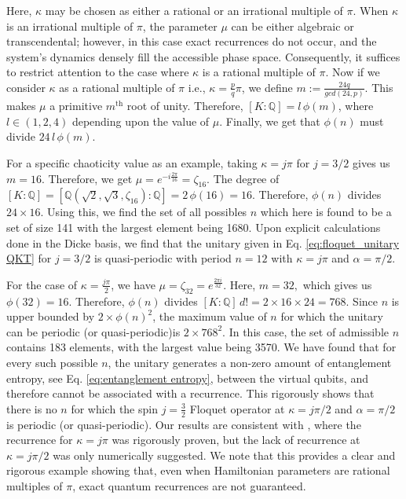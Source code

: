 \documentclass[a4paper,onecolumn,accepted=2026-04-08,10pt]{quantumarticle}
\theoremstyle{definition}
\begin{document}
Here, $\kappa$ may be chosen as either a rational or an irrational multiple of $\pi$. When $\kappa$ is an irrational multiple of $\pi$, the parameter $\mu$ can be either algebraic or transcendental; however, in this case exact recurrences do not occur, and the system’s dynamics densely fill the accessible phase space. Consequently, it suffices to restrict attention to the case where $\kappa$ is a rational multiple of $\pi$.
Now if we consider $\kappa$ as a rational multiple of $\pi$ i.e., $\kappa=\frac{p}{q}\pi$, we define $m:=\frac{24q}{gcd(24,p)}$. This makes $\mu$ a primitive $m^{\text{th}}$ root of unity. Therefore, $[K:\mathbb{Q}] = l\, \phi(m)$, where $l\in{(1,2,4)}$ depending upon the value of $\mu$. Finally, we get that $\phi(n)$  must divide $24 \,l\,\phi(m)$. 

For a specific chaoticity value as an example, taking $\kappa=j\pi$ for $j=3/2$ gives us $m=16$. Therefore, we get $\mu = e^{-i\frac{2\pi}{16}} = \zeta_{16}$. The degree of $[K:\mathbb{Q}] = [\mathbb{Q}(\sqrt{2},\sqrt{3},\zeta_{16}):\mathbb{Q}]=2 \, \phi(16) = 16$. Therefore, $\phi(n)$ divides $24\times16$. Using this, we find the set of all possibles $n$ which here is found to be a set of size 141 with the largest element being 1680. Upon explicit calculations done in the Dicke basis, we find that the unitary given in Eq. \eqref{eq:floquet_unitary QKT} for $j=3/2$ is quasi-periodic with period $n=12$ with $\kappa=j\pi$ and $\alpha=\pi/2$.

For the case of $\kappa=\frac{j \pi}{2}$, we have $\mu = \zeta_{32} = e^{\frac{2\pi i}{32}}$. Here, $m = 32,$ which gives us $\phi(32) = 16$. Therefore,  $\phi(n)$ divides $[K:\mathbb{Q}]\,d!= 2\times16 \times 24 = 768.$ Since $n$ is upper bounded by $2\times \phi(n)^2$, the maximum value of $n$ for which the unitary can be periodic (or quasi-periodic)is $2\times 768^2$. In this case, the set of admissible $n$ contains 183 elements, with the largest value being 3570. We have found that for every such possible $n$, the unitary generates a non-zero amount of entanglement entropy, see Eq.  \eqref{eq:entanglement entropy}, between the virtual qubits, and therefore cannot be associated with a recurrence.  This rigorously shows that there is no $n$ for which the spin $j=\frac{3}{2}$ Floquet operator at $\kappa= j \pi/2$ and $\alpha=\pi/2$ is periodic (or quasi-periodic). Our results are consistent with \cite{anand_davis_ghose_2024}, where the recurrence for $\kappa=j\pi$ was rigorously proven, but the lack of recurrence at $\kappa=j\pi/2$ was only numerically suggested.
We note that this provides a clear and rigorous example showing that, even when Hamiltonian parameters are rational multiples of  $\pi$, exact quantum recurrences are not guaranteed.
\end{document}
